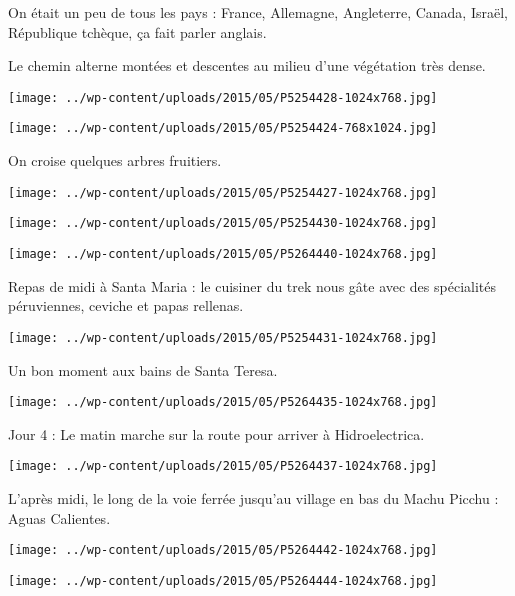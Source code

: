On était un peu de tous les pays : France, Allemagne, Angleterre, Canada, Israël, République tchèque, ça fait parler anglais.

Le chemin alterne montées et descentes au milieu d'une végétation très dense. 
\begin{center} \texttt{[image: ../wp-content/uploads/2015/05/P5254428-1024x768.jpg]} \end{center}

\begin{center} \texttt{[image: ../wp-content/uploads/2015/05/P5254424-768x1024.jpg]} \end{center}

On croise quelques arbres fruitiers. 
\begin{center} \texttt{[image: ../wp-content/uploads/2015/05/P5254427-1024x768.jpg]} \end{center}

\begin{center} \texttt{[image: ../wp-content/uploads/2015/05/P5254430-1024x768.jpg]} \end{center}
\begin{center} \texttt{[image: ../wp-content/uploads/2015/05/P5264440-1024x768.jpg]} \end{center}
\pagebreak

Repas de midi à Santa Maria : le cuisiner du trek nous gâte avec des spécialités péruviennes, ceviche et papas rellenas. 
\begin{center} \texttt{[image: ../wp-content/uploads/2015/05/P5254431-1024x768.jpg]} \end{center}

Un bon moment aux bains de Santa Teresa. 
\begin{center} \texttt{[image: ../wp-content/uploads/2015/05/P5264435-1024x768.jpg]} \end{center}
\pagebreak

Jour 4 : Le matin marche sur la route pour arriver à Hidroelectrica. 
\begin{center} \texttt{[image: ../wp-content/uploads/2015/05/P5264437-1024x768.jpg]} \end{center}

L'après midi, le long de la voie ferrée jusqu'au village en bas du Machu Picchu : Aguas Calientes. 
\begin{center} \texttt{[image: ../wp-content/uploads/2015/05/P5264442-1024x768.jpg]} \end{center}
\begin{center} \texttt{[image: ../wp-content/uploads/2015/05/P5264444-1024x768.jpg]} \end{center}

